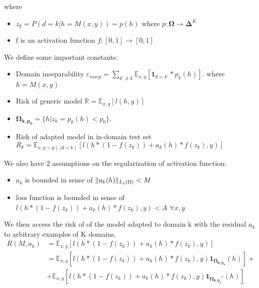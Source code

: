 \documentclass[12pt,a4paper,twoside]{report}
\theoremstyle{definition}
\begin{document}
where 
\begin{itemize}
	\item $z_k = P(d=k | h=M(x,y)) = p(h)$ where $p: \mathbf{\Omega} \rightarrow \mathbf{\Delta}^{K}$
	\item f is an activation function $f: [0,1] \rightarrow [0,1]$ 
\end{itemize}
We define some important constants:
\begin{itemize}
	\item Domain inseparability $\mathbb{\varepsilon}_{insep} = \displaystyle{\mathop{\sum}_{k' \neq k} \mathbb{E}_{x,y}[\mathbf{1}_{d=k'}*p_k(h)]}$. where $h=M(x,y)$
	\item Risk of generic model $\mathbb{R} = \mathbb{E}_{x,y}[l(h,y)]$
	\item $\mathbf{\Omega_{k,p_{0}}} = \lbrace h | z_k = p_k(h)<p_0\rbrace$.
	\item Risk of adapted model in in-domain test set $R_k = \displaystyle{\mathbb{E}_{x,y \sim p(.|d=k)}[l(h * (1-f(z_k)) + a_k(h) * f(z_k), y)]}$
\end{itemize}
We also have 2 assumptions on the regularization of activation function:
\begin{itemize}
	\item $a_k$ is bounded in sense of $\normL{a_k(h)} < M$
	\item loss function is bounded in sense of $l(h * (1-f(z_k)) + a_k(h) * f(z_k),y) < A$ $\forall x,y$
\end{itemize}
We then access the risk of of the model adapted to domain k with the residual $a_k$ to arbitrary examples of K domains.
\begin{equation}
\begin{split}
R(M,a_k) &= \mathbb{E}_{x,y}[l(h * (1-f(z_k)) + a_k(h) * f(z_k),y)] \\
		&= \mathbb{E}_{x,y}[l(h * (1-f(z_k)) + a_k(h) * f(z_k),y)\mathbf{1}_{\mathbf{\Omega_{k,p_{0}}}}(h)] + \\
		&+ \mathbb{E}_{x,y}[l(h * (1-f(z_k)) + a_k(h) * f(z_k),y) \mathbf{1}_{\mathbf{\Omega_{k,p_{0}}}^{c}}(h)]
\end{split}
\end{equation}
\end{document}
